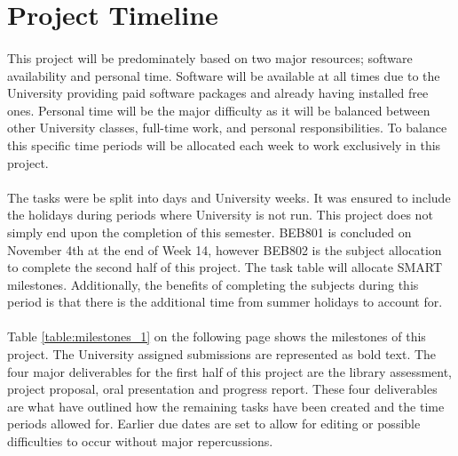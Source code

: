 \newpage
\section{Project Timeline}

\paragraph{}
This project will be predominately based on two major resources; software availability and personal time. Software will be available at all times due to the University providing paid software packages and already having installed free ones. Personal time will be the major difficulty as it will be balanced between other University classes, full-time work, and personal responsibilities. To balance this specific time periods will be allocated each week to work exclusively in this project.    

\paragraph{}
The tasks were be split into days and University weeks. It was ensured to include the holidays during periods where University is not run. This project does not simply end upon the completion of this semester. BEB801 is concluded on November 4th at the end of Week 14, however BEB802 is the subject allocation to complete the second half of this project. The task table will allocate SMART milestones. Additionally, the benefits of completing the subjects during this period is that there is the additional time from summer holidays to account for.

\paragraph{}
Table \ref{table:milestones_1} on the following page shows the milestones of this project. The University assigned submissions are represented as bold text. The four major deliverables for the first half of this project are the library assessment, project proposal, oral presentation and progress report. These four deliverables are what have outlined how the remaining tasks have been created and the time periods allowed for. Earlier due dates are set to allow for editing or possible difficulties to occur without major repercussions. 

